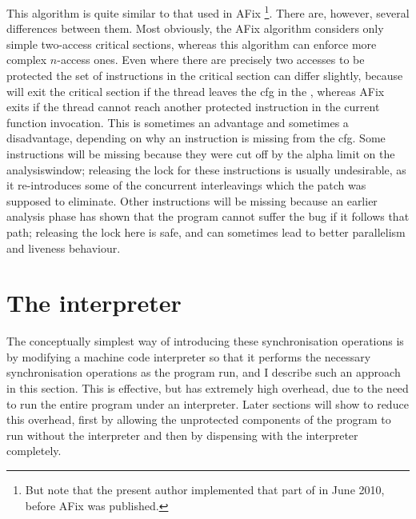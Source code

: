\label{sect:fixing:rw_afix}
This algorithm is quite similar to that used in AFix
\cite{Jin2011}\footnote{But note that the present author implemented
  that part of {\implementation} in June 2010, before AFix was
  published.}.  There are, however, several differences between them.
Most obviously, the AFix algorithm considers only simple two-access
critical sections, whereas this algorithm can enforce more complex
$n$-access ones.  Even where there are precisely two accesses to be
protected the set of instructions in the critical section can differ
slightly, because {\technique} will exit the critical section if the
thread leaves the \gls{cfg} in the {\StateMachine}, whereas AFix exits
if the thread cannot reach another protected instruction in the
current function invocation.  This is sometimes an advantage and
sometimes a disadvantage, depending on why an instruction is missing
from the {\StateMachine} \gls{cfg}.  Some instructions will be missing
because they were cut off by the \gls{alpha} limit on the
\gls{analysiswindow}; releasing the lock for these instructions is
usually undesirable, as it re-introduces some of the concurrent
interleavings which the patch was supposed to eliminate.  Other
instructions will be missing because an earlier analysis phase has
shown that the program cannot suffer the bug if it follows that path;
releasing the lock here is safe, and can sometimes lead to better
parallelism and liveness behaviour.

\section{The interpreter}

The conceptually simplest way of introducing these synchronisation
operations is by modifying a machine code interpreter so that it
performs the necessary synchronisation operations as the program run,
and I describe such an approach in this section.  This is effective,
but has extremely high overhead, due to the need to run the entire
program under an interpreter.  Later sections will show to reduce this
overhead, first by allowing the unprotected components of the program
to run without the interpreter and then by dispensing with the
interpreter completely.

